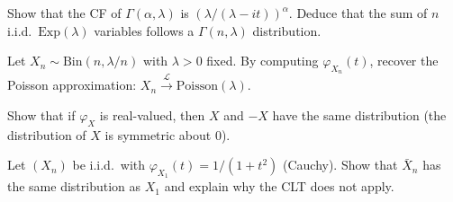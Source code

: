 \begin{exercise}
Show that the CF of $\Gamma(\alpha, \lambda)$ is
$(\lambda/(\lambda-it))^\alpha$. Deduce that the sum of $n$ i.i.d.\
$\mathrm{Exp}(\lambda)$ variables follows a $\Gamma(n, \lambda)$ distribution.
\end{exercise}

\begin{exercise}
Let $X_n \sim \mathrm{Bin}(n, \lambda/n)$ with $\lambda > 0$ fixed. By computing
$\varphi_{X_n}(t)$, recover the Poisson approximation:
$X_n \xrightarrow{\mathcal{L}} \mathrm{Poisson}(\lambda)$.
\end{exercise}

\begin{exercise}
Show that if $\varphi_X$ is real-valued, then $X$ and $-X$ have the same
distribution (the distribution of $X$ is symmetric about $0$).
\end{exercise}

\begin{exercise}
Let $(X_n)$ be i.i.d.\ with $\varphi_{X_1}(t) = 1/(1+t^2)$ (Cauchy). Show that
$\bar{X}_n$ has the same distribution as $X_1$ and explain why the CLT does not
apply.
\end{exercise}
